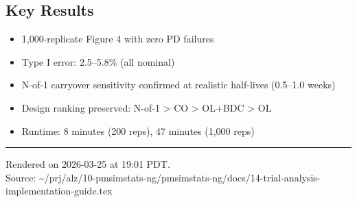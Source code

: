 \documentclass[11pt]{article}
\begin{document}
\subsection{Key Results}

\begin{itemize}
  \item 1,000-replicate Figure 4 with zero PD failures
  \item Type I error: 2.5--5.8\% (all nominal)
  \item N-of-1 carryover sensitivity confirmed at realistic
    half-lives (0.5--1.0 weeks)
  \item Design ranking preserved: N-of-1 > CO > OL+BDC > OL
  \item Runtime: 8 minutes (200 reps), 47 minutes (1,000 reps)
\end{itemize}

\vfill
\noindent\rule{\textwidth}{0.4pt}
{\footnotesize
Rendered on 2026-03-25 at 19:01 PDT.\\
Source: \textasciitilde/prj/alz/10-pmsimstats-ng/pmsimstats-ng/docs/14-trial-analysis-implementation-guide.tex}
\end{document}
